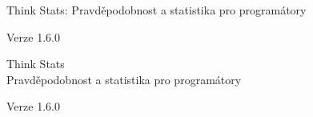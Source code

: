 \documentclass[12pt]{book}
\newcommand{\theversion}{1.6.0}
\begin{document}



\begin{latexonly}

\renewcommand{\blankpage}{\thispagestyle{empty} \quad \newpage}



\thispagestyle{empty}

\begin{flushright}
\vspace*{2.0in}

\begin{spacing}{3}
{\huge Think Stats: Pravděpodobnost a statistika pro programátory}\\
{\Large }
\end{spacing}

\vspace{0.25in}

Verze \theversion

\vfill

\end{flushright}


\blankpage
\blankpage

\pagebreak
\thispagestyle{empty}

\begin{flushright}
\vspace*{2.0in}

\begin{spacing}{3}
{\huge Think Stats}\\
{\Large Pravděpodobnost a statistika pro programátory}
\end{spacing}

\vspace{0.25in}

Verze \theversion

\vspace{1in}



\end{flushright}
\end{latexonly}
\end{document}
